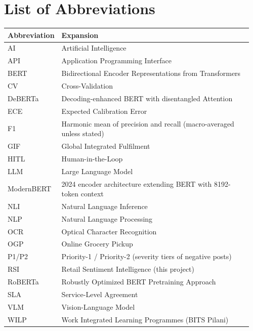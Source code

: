\chapter*{List of Abbreviations}

\begin{longtable}{@{}p{0.18\linewidth}p{0.78\linewidth}@{}}
\bfseries Abbreviation & \bfseries Expansion\\
\midrule
\endhead
AI     & Artificial Intelligence\\
API    & Application Programming Interface\\
BERT   & Bidirectional Encoder Representations from Transformers\\
CV     & Cross-Validation\\
DeBERTa & Decoding-enhanced BERT with disentangled Attention\\
ECE    & Expected Calibration Error\\
F1     & Harmonic mean of precision and recall (macro-averaged unless stated)\\
GIF    & Global Integrated Fulfilment\\
HITL   & Human-in-the-Loop\\
LLM    & Large Language Model\\
ModernBERT & 2024 encoder architecture extending BERT with 8192-token context\\
NLI    & Natural Language Inference\\
NLP    & Natural Language Processing\\
OCR    & Optical Character Recognition\\
OGP    & Online Grocery Pickup\\
P1/P2  & Priority-1 / Priority-2 (severity tiers of negative posts)\\
RSI    & Retail Sentiment Intelligence (this project)\\
RoBERTa & Robustly Optimized BERT Pretraining Approach\\
SLA    & Service-Level Agreement\\
VLM    & Vision-Language Model\\
WILP   & Work Integrated Learning Programmes (BITS Pilani)\\
\end{longtable}
\cleardoublepage
